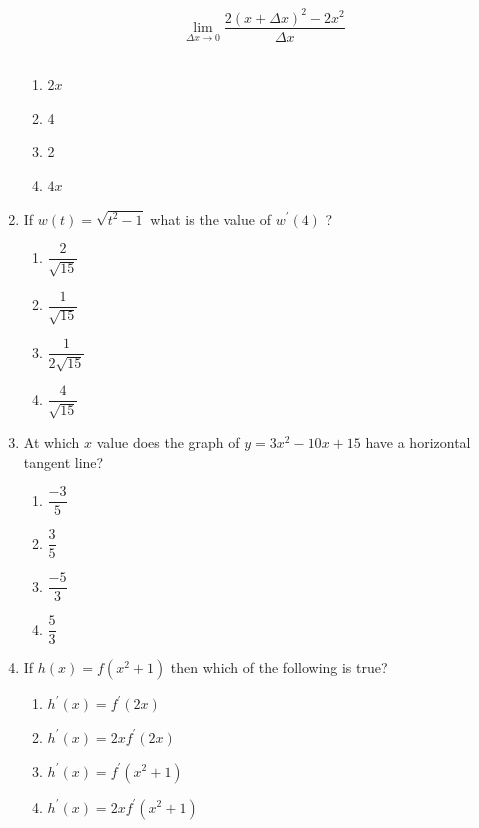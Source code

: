 \documentclass{article}
\begin{document}
\begin{enumerate}
\begin{minipage}[t]{\linewidth}
\[
\lim _{\Delta x \rightarrow 0} \frac{2(x+\Delta x)^{2}-2 x^{2}}{\Delta x}
\]\\[0.1em]
		\begin{enumerate}
		\itemsep1em
			\item  $2 x$
			\item  4
			\item  2
			\item  $4 x$
		\end{enumerate}
	\end{minipage}
	\item
	\begin{minipage}[t]{\linewidth}
		If \(w(t)=\sqrt{t^{2}-1}\) what is the value of \(w^{\prime}(4)\) ?\\[0.1em]
		\begin{enumerate}
		\itemsep1em
			\item  $\dfrac{2}{\sqrt{15}}$
			\item  $\dfrac{1}{\sqrt{15}}$
			\item  $\dfrac{1}{2 \sqrt{15}}$
			\item  $\dfrac{4}{\sqrt{15}}$
		\end{enumerate}
	\end{minipage}
	\item
	\begin{minipage}[t]{\linewidth}
		At which \(x\) value does the graph of \(y=3 x^{2}-10 x+15\) have a
horizontal tangent line?\\[0.1em]
		\begin{enumerate}
		\itemsep1em
			\item  $\dfrac{-3}{5}$
			\item  $\dfrac{3}{5}$
			\item  $\dfrac{-5}{3}$
			\item  $\dfrac{5}{3}$
		\end{enumerate}
	\end{minipage}
	\item
	\begin{minipage}[t]{\linewidth}
		If \(h(x)=f\left(x^{2}+1\right)\) then which of the following is true?\\[0.1em]
		\begin{enumerate}
		\itemsep1em
			\item  $h^{\prime}(x)=f^{\prime}(2 x)$
			\item  $h^{\prime}(x)=2 x f^{\prime}(2 x)$
			\item  $h^{\prime}(x)=f^{\prime}\left(x^{2}+1\right)$
			\item  $h^{\prime}(x)=2x f^{\prime}\left(x^{2}+1\right)$

\end{enumerate}
\end{minipage}
\end{enumerate}
\end{document}
